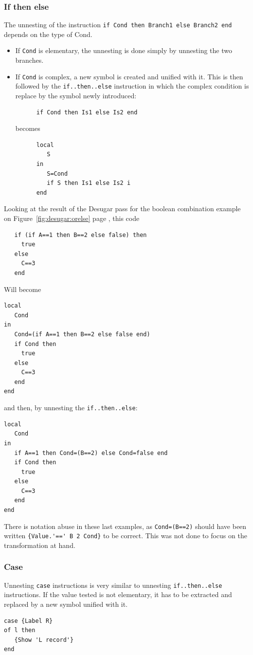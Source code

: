\documentclass[a4paper]{memoir}
\begin{document}
\subsubsection{If then else}
The unnesting of the instruction \lstinline!if Cond then Branch1 else Branch2 end! depends on the type of Cond. 
\begin{itemize}
  \item If \lstinline!Cond! is elementary, the unnesting is done simply by unnesting the two branches.
  \item If \lstinline!Cond! is complex, a new symbol is created and unified with it. This is then followed by the \lstinline!if..then..else! instruction in which the complex condition is replace by the symbol newly introduced:
    \begin{lstlisting}
      if Cond then Is1 else Is2 end 
    \end{lstlisting}
    becomes 
    \begin{lstlisting}
      local 
         S 
      in 
         S=Cond 
         if S then Is1 else Is2 i
      end
    \end{lstlisting}
\end{itemize}
Looking at the result of the Desugar pass for the boolean combination example on
Figure~\ref{fig:desugar:orelse} page \pageref{fig:desugar:orelse}, this code
\begin{lstlisting}
   if (if A==1 then B==2 else false) then
     true
   else
     C==3
   end
\end{lstlisting}

Will become

\begin{lstlisting}
local
   Cond
in
   Cond=(if A==1 then B==2 else false end)
   if Cond then
     true
   else
     C==3
   end
end
\end{lstlisting}
and then, by unnesting the \lstinline!if..then..else!:
\begin{lstlisting}
local
   Cond
in
   if A==1 then Cond=(B==2) else Cond=false end
   if Cond then
     true
   else
     C==3
   end
end
\end{lstlisting}

There is notation abuse in these last examples, as \lstinline!Cond=(B==2)!
should have been written \lstinline!{Value.'==' B 2 Cond}! to be correct. This was
not done to focus on the transformation at hand.

\subsubsection{Case}
Unnesting \lstinline!case! instructions is very similar to unnesting
\lstinline!if..then..else! instructions. If the value tested is not elementary,
it has to be extracted and replaced by a new symbol unified with it.
\begin{lstlisting}
case {Label R}
of l then
   {Show 'L record'}
end
\end{lstlisting}
\end{document}
